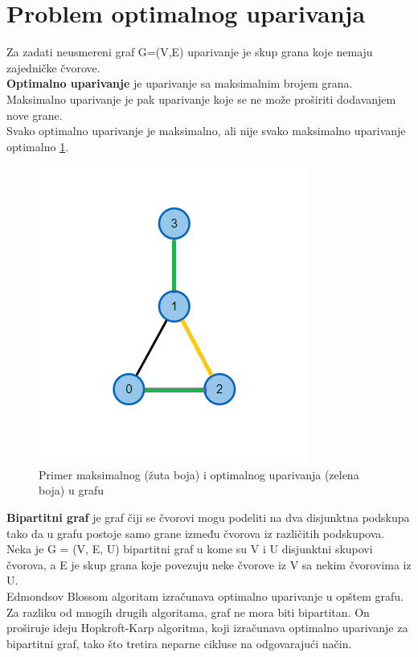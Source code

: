 \documentclass[11pt,a4paper]{article}
\theoremstyle{definition}
\begin{document}
\section{Problem optimalnog uparivanja}
Za zadati neusmereni graf G=(V,E) uparivanje je skup grana koje nemaju zajedničke čvorove.\\ \textbf{Optimalno uparivanje} je uparivanje sa maksimalnim brojem grana.\cite{knjiga1}\\ Maksimalno uparivanje je pak uparivanje koje se ne može proširiti dodavanjem nove grane.\\ Svako optimalno uparivanje je maksimalno, ali nije svako maksimalno uparivanje optimalno \ref{fig:slika 1}.
\begin{figure}[H]
\begin{center}
\includegraphics[scale=0.7]{graf1.png}
\end{center}
\caption{Primer maksimalnog (žuta boja) i optimalnog uparivanja (zelena boja) u grafu}
\label{fig:slika 1}
\end{figure}
\textbf{Bipartitni graf} je graf čiji se čvorovi mogu podeliti na dva disjunktna podskupa
tako da u grafu postoje samo grane između čvorova iz različitih podskupova.
Neka je G = (V, E, U) bipartitni graf u kome su V i U disjunktni skupovi čvorova,
a E je skup grana koje povezuju neke čvorove iz V sa nekim čvorovima iz U. \\

Edmondsov Blossom algoritam izračunava optimalno uparivanje u opštem grafu. Za razliku od mnogih drugih algoritama, graf ne mora biti bipartitan. On proširuje ideju Hopkroft-Karp algoritma, koji izračunava optimalno uparivanje za bipartitni graf, tako što tretira neparne cikluse na odgovarajući način.
\end{document}
